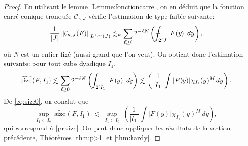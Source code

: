 \documentclass[11pt]{amsart}
\DeclareMathOperator{\dive}{div}
\newcommand{\sssize}{\widetilde{\text{size}\,}}
\def\Xint#1{\mathchoice
   {\XXint\displaystyle\textstyle{#1}}%
   {\XXint\textstyle\scriptstyle{#1}}%
   {\XXint\scriptstyle\scriptscriptstyle{#1}}%
   {\XXint\scriptscriptstyle\scriptscriptstyle{#1}}%
   \!\int}
\def\XXint#1#2#3{{\setbox0=\hbox{$#1{#2#3}{\int}$}
     \vcenter{\hbox{$#2#3$}}\kern-.5\wd0}}
\def\aver#1{\Xint-_{#1}}
\begin{document}
\begin{proof}
En utilisant le lemme \ref{Lemme:fonctioncarre}, on en d\'eduit que la fonction carr\'e conique tronqu\'ee ${\mathcal C}_{\kappa,J}$ v\'erifie l'estimation de type faible suivante:
$$  \frac{1}{|J|}\left\| {\mathcal C}_{\kappa,J}(F)\right\|_{L^{1,\infty}(J)} \lesssim_\kappa \sum_{\ell \geq 0} 2^{-\ell N} \left(\aver{2^\ell J} |F(y)| \, dy \right),$$
o\`u $N$ est un entier fix\'e (aussi grand que l'on veut).
On obtient donc l'estimation suivante: pour tout cube dyadique $I_1$,
$$ \sssize(F,I_1) \lesssim  \sum_{\ell \geq 0} 2^{-\ell N} \left(\aver{2^\ell I_1} |F(y)| \, dy \right) \lesssim \left(\frac{1}{|I_1|}\int  |F(y)| \chi_{I_1}(y)^M \, dy\right).$$
De \eqref{eq:size0}, on conclut que
$$ \sup_{I_1 \subset I_0} \ \sssize(F,I_1) \ \lesssim \ \sup_{I_1 \subset I_0}   \ \left(\frac{1}{|I_1|}\int  |F(y)| \chi_{I_1}(y)^M \, dy \right),$$
qui correspond \`a \eqref{pr:size}.
On peut donc appliquer les r\'esultats de la section pr\'ec\'edente, Th\'eor\`emes \ref{thm:p>1} et \ref{thm:hardy}.
\end{proof}
\end{document}
